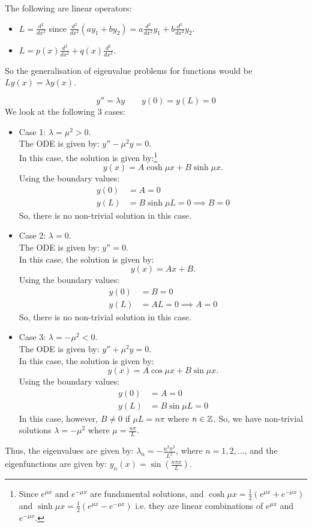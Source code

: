 \begin{eg}\label{eg:linearmap}
	The following are linear operators:
	\begin{itemize}
		\item $L = \frac{d^2}{dx^2}$ since $\frac{d^2}{dx^2}(ay_1 + by_2) = a \frac{d^2}{dx^2}y_1 + b \frac{d^2}{dx^2}y_2$.
		\item $L = p(x)\frac{d^2}{dx^2} + q(x)\frac{d^2}{dx^2}$.
	\end{itemize}
\end{eg}

So the generalisation of eigenvalue problems for functions would be $Ly(x) = \lambda y(x)$.

\begin{eg}
	\[
	y'' = \lambda y \qquad y(0) = y(L) = 0
	\]
	We look at the following 3 cases:
	\begin{itemize}
		\item Case 1: $\lambda = \mu^2 > 0$.\\
		The ODE is given by: $y'' - \mu^2 y = 0$.\\
		In this case, the solution is given by:\footnote{Since $e^{\mu x}$ and $e^{-\mu x}$ are fundamental solutions, and $\cosh{\mu x} = \frac12(e^{\mu x} + e^{-\mu x})$ and $\sinh{\mu x} = \frac12(e^{\mu x} - e^{-\mu x})$ i.e. they are linear combinations of $e^{\mu x}$ and $e^{-\mu x}$.}
		\[
		y(x) = A \cosh{\mu x} + B \sinh{\mu x}.
		\]
		Using the boundary values:
		\begin{align*}
			y(0) &= A = 0 \\
			y(L) &= B \sinh{\mu L} = 0 \implies B=0
		\end{align*}
		So, there is no non-trivial solution in this case.
		
		\item Case 2: $\lambda = 0$.\\
		The ODE is given by: $y''= 0$.\\
		In this case, the solution is given by:
		\[
		y(x) = Ax + B.
		\]
		Using the boundary values:
		\begin{align*}
			y(0) &= B = 0 \\
			y(L) &= AL = 0 \implies A = 0
		\end{align*}
		So, there is no non-trivial solution in this case.
		
		\item Case 3: $\lambda = -\mu^2 < 0$.\\
		The ODE is given by: $y'' + \mu^2 y = 0$.\\
		In this case, the solution is given by:
		\[
		y(x) = A \cos{\mu x} + B \sin{\mu x}.
		\]
		Using the boundary values:
		\begin{align*}
			y(0) &= A = 0 \\
			y(L) &= B \sin{\mu L} = 0
		\end{align*}
		In this case, however, $B \neq 0$ if $\mu L = n \pi$ where $n \in \mathbb{Z}$. So, we have non-trivial solutions $\lambda = -\mu^2$ where $\mu = \frac{n \pi}{L}$.
	\end{itemize}
	Thus, the eigenvalues are given by: $\lambda_n = -\frac{n^2\pi^2}{L^2}$, where $n = 1, 2, \dots$, and the eigenfunctions are given by: $y_n(x) = \sin\left(\frac{n\pi x}{L}\right)$.
	

\end{eg}
